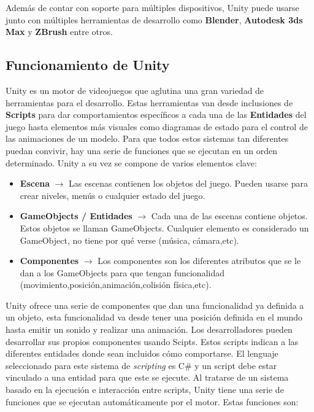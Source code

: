Adem\'as de contar con soporte para m\'ultiples dispositivos, Unity puede usarse junto con m\'ultiples herramientas de desarrollo como \textbf{Blender}, \textbf{Autodesk 3ds Max} y \textbf{ZBrush} entre otros.

\subsection {Funcionamiento de Unity}

Unity es un motor de videojuegos que aglutina una gran variedad de herramientas para el desarrollo. Estas herramientas van desde inclusiones de \textbf{Scripts} para dar comportamientos espec\'ificos a cada una de las \textbf{Entidades} del juego hasta elementos m\'as visuales como diagramas de estado para el control de las animaciones de un modelo. Para que todos estos sistemas tan diferentes puedan convivir, hay una serie de funciones que se ejecutan en un orden determinado. Unity a su vez se compone de varios elementos clave:

\begin {itemize}
\item \textbf{Escena} $\rightarrow$  Las escenas contienen los objetos del juego. Pueden usarse para crear niveles, men\'us o cualquier estado del juego.
\item \textbf{GameObjects / Entidades} $\rightarrow$ Cada una de las escenas contiene objetos. Estos objetos se llaman GameObjects. Cualquier elemento es considerado un GameObject, no tiene por qu\'e verse (m\'usica, c\'amara,etc).
\item \textbf{Componentes} $\rightarrow$ Los componentes son los diferentes atributos que se le dan a los GameObjects para que tengan funcionalidad (movimiento,posici\'on,animaci\'on,colisi\'on f\'isica,etc).
\end {itemize}

Unity ofrece una serie de componentes que dan una funcionalidad ya definida a un objeto, esta funcionalidad va desde tener una posici\'on definida en el mundo hasta emitir un sonido y realizar una animaci\'on. Los desarrolladores pueden desarrollar sus propios componentes usando Scipts. Estos scripts indican a las diferentes entidades donde sean incluidos c\'omo comportarse. El lenguaje seleccionado para este sistema de \textit{scripting} es C\# y un script debe estar vinculado a una entidad para que este se ejecute. Al tratarse de un sistema basado en la ejecuci\'on e interacci\'on entre scripts, Unity tiene una serie de funciones que se ejecutan autom\'aticamente por el motor. Estas funciones son:


